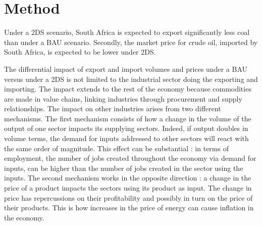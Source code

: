 \documentclass[12pt,english]{article}
\begin{document}
\section{Method}

Under a 2DS scenario, South Africa is expected to export significantly less coal than under a BAU scenario. Secondly, the market price for crude oil, imported by South Africa, is expected to be lower under 2DS. %


The differential impact of export and import volumes and prices under a BAU versus under a 2DS is not limited to the industrial sector doing the exporting and importing. The impact extends to the rest of the economy because commodities are made in value chains, linking industries through procurement and supply relationships. The impact on other industries arises from two different mechanisms. The first mechanism consists of how a change in the volume of the output of one sector impacts its supplying sectors. Indeed, if output doubles in volume terms, the demand for inputs addressed to other sectors will react with the same order of magnitude. This effect can be substantial : in terms of employment, the number of jobs created throughout the economy via demand for inputs, can be higher than the number of jobs created in the sector using the inputs. The second mechanism works in the opposite direction : a change in the price of a product impacts the sectors using its product as input. The change in price has repercussions on their profitability and possibly in turn on the price of their products. This is how increases in the price of energy can cause inflation in the economy.

\end{document}
